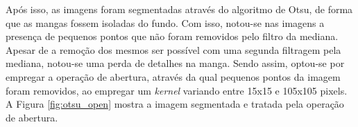\begin{figure}[H]
\end{figure}

Após isso, as imagens foram segmentadas através do algoritmo de Otsu, de forma que as mangas fossem isoladas do fundo. Com isso, notou-se nas imagens a presença de pequenos pontos que não foram removidos pelo filtro da mediana. Apesar de a remoção dos mesmos ser possível com uma segunda filtragem pela mediana, notou-se uma perda de detalhes na manga. Sendo assim, optou-se por empregar a operação de abertura, através da qual pequenos pontos da imagem foram removidos, ao empregar um \textit{kernel} variando entre 15x15 e 105x105 pixels. A Figura \ref{fig:otsu_open} mostra a imagem segmentada e tratada pela operação de abertura.

